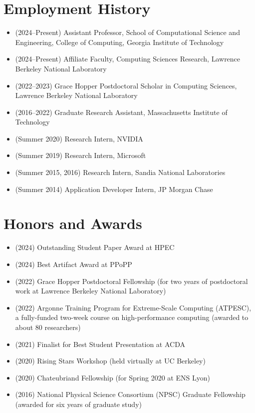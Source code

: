\section{Employment History}
\begin{adjustwidth}{2em}{0pt}

\begin{itemize}
    \item (2024--Present) Assistant Professor, School of Computational Science
    and Engineering, College of Computing, Georgia Institute of Technology
        \item (2024--Present) Affiliate Faculty, Computing Sciences Research,
        Lawrence Berkeley National Laboratory
    \item (2022--2023) Grace Hopper Postdoctoral Scholar in Computing Sciences,
    Lawrence Berkeley National Laboratory
    \item (2016--2022) Graduate Research Assistant, Massachusetts Institute of Technology
\item (Summer 2020) Research Intern, NVIDIA
\item (Summer 2019) Research Intern, Microsoft
\item (Summer 2015, 2016) Research Intern, Sandia National Laboratories
\item (Summer 2014) Application Developer Intern, JP Morgan Chase
\end{itemize}

\end{adjustwidth}

\section{Honors and Awards}
\begin{adjustwidth}{2em}{0pt}

\begin{itemize}
    \item (2024) Outstanding Student Paper Award at HPEC
    \item (2024) Best Artifact Award at PPoPP
    \item (2022) Grace Hopper Postdoctoral Fellowship (for two years of
    postdoctoral work at Lawrence Berkeley National Laboratory)
    \item (2022) Argonne Training Program for Extreme-Scale Computing (ATPESC), a fully-funded two-week course on high-performance computing (awarded to about 80 researchers)
    \item (2021) Finalist for Best Student Presentation at ACDA
    \item (2020) Rising Stars Workshop (held virtually at UC Berkeley)
    \item (2020) Chateubriand Fellowship (for Spring 2020 at ENS Lyon)
    \item (2016) National Physical Science Consortium (NPSC) Graduate Fellowship
  (awarded for six years of graduate study)
\end{itemize}

\end{adjustwidth}

